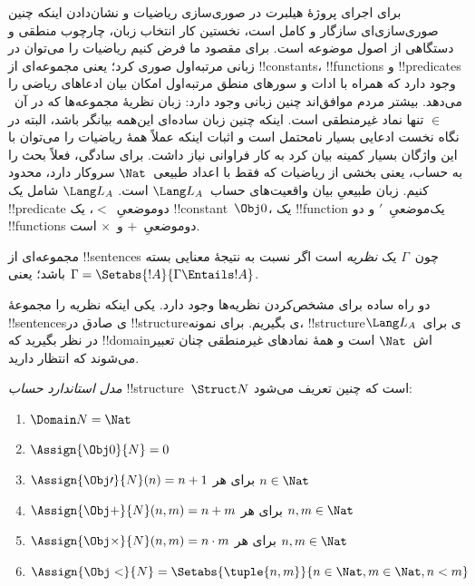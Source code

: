 \documentclass[../../../include/open-logic-section]{subfiles}
\begin{document}


برای اجرای پروژهٔ هیلبرت در صوری‌سازی ریاضیات و نشان‌دادن اینکه چنین
صوری‌سازی‌ای سازگار و کامل است، نخستین کار انتخاب زبان، چارچوب منطقی
و دستگاهی از اصول موضوعه است. برای مقصود ما فرض کنیم ریاضیات را
می‌توان در زبانی مرتبه‌اول صوری کرد؛ یعنی مجموعه‌ای از !!{constant}s،
!!{function}s و !!{predicate}s وجود دارد که همراه با ادات و سورهای منطق
مرتبه‌اول امکان بیان ادعاهای ریاضی را می‌دهد. بیشتر مردم موافق‌اند
چنین زبانی وجود دارد: زبان نظریهٔ مجموعه‌ها که در آن~$\in$ تنها نماد
غیرمنطقی است. اینکه چنین زبان ساده‌ای این‌همه بیانگر باشد، البته در
نگاه نخست ادعایی بسیار نامحتمل است و اثبات اینکه عملاً همهٔ ریاضیات
را می‌توان با این واژگان بسیار کمینه بیان کرد به کار فراوانی نیاز
داشت. برای سادگی، فعلاً بحث را به حساب، یعنی بخشی از ریاضیات که فقط
با اعداد طبیعی~$\Nat$ سروکار دارد، محدود کنیم. زبان طبیعیِ بیان
واقعیت‌های حساب~$\Lang L_A$ است. $\Lang L_A$ شامل یک !!{predicate}
دوموضعیِ~$<$، یک !!{constant}~$\Obj 0$، یک !!{function} یک‌موضعیِ~$\prime$
و دو !!{function}s دوموضعیِ~$+$ و~$\times$ است.

\begin{defn}
مجموعه‌ای از !!{sentence}s چون~$\Gamma$ یک \emph{نظریه} است اگر نسبت به
نتیجهٔ معنایی بسته باشد؛ یعنی
$\Gamma=\Setabs{!A}{\Gamma\Entails !A}$.
\end{defn}

دو راه ساده برای مشخص‌کردن نظریه‌ها وجود دارد. یکی اینکه نظریه را
مجموعهٔ !!{sentence}sی صادق در !!{structure}ی بگیریم. برای نمونه، !!{structure}ی
برای~$\Lang L_A$ در نظر بگیرید که !!{domain}اش~$\Nat$ است و همهٔ
نمادهای غیرمنطقی چنان تعبیر می‌شوند که انتظار دارید.

\begin{defn}
\emph{مدل استاندارد حساب} !!{structure}~$\Struct N$ است که چنین تعریف
می‌شود:
\begin{enumerate}
\item $\Domain N = \Nat$
\item $\Assign{\Obj 0}{N} = 0$
\item $\Assign{\Obj \prime}{N}(n) = n + 1$ برای هر $n \in \Nat$
\item $\Assign{\Obj +}{N}(n, m) = n + m$ برای هر $n, m \in \Nat$
\item $\Assign{\Obj \times}{N}(n, m) = n\cdot m$ برای هر $n, m \in \Nat$
\item $\Assign{\Obj <}{N} = \Setabs{\tuple{n, m}}{n \in \Nat, m \in
  \Nat, n < m}$
\end{enumerate}
\end{defn}
\end{document}
